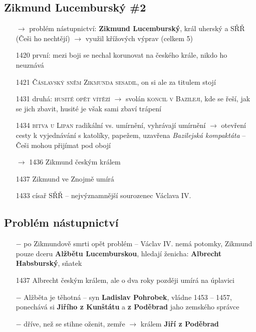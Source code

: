 \documentclass{article}
\begin{document}
\subsection*{Zikmund Lucemburský \#2}
\begin{itemize}
    \vspace{-0.5em}
    \setlength\itemsep{0.15em}
    \item[$\rightarrow$] problém nástupnictví: \textbf{Zikmund Lucemburský}, král uherský a SŘŘ (Češi ho nechtějí) $\rightarrow$ využil křížových výprav (celkem 5)
    \item[1420] první: mezi boji se nechal korunovat na českého krále, nikdo ho neuznává
    \item[1421] \textsc{Čáslavský sněm Zikmunda sesadil}, on si ale za titulem stojí
    \item[1431] druhá: \textsc{husité opět vítězí} $\rightarrow$ svolán \textsc{koncil v Bazileji}, kde se řeší, jak se jich zbavit, husité je však sami zbaví trápení
    \item[1434] \textsc{bitva u Lipan} radikální vs. umírnění, vyhrávají umírnění $\rightarrow$ otevření cesty k vyjednávání s katolíky, papežem, uzavřena \textit{Bazilejská kompaktáta} -- Češi mohou přijímat pod obojí
    \item[$\rightarrow$ 1436] Zikmund českým králem
    \item[1437] Zikmund ve Znojmě umírá
    \item[1433] císař SŘŘ -- nejvýznamnější sourozenec Václava IV.
\end{itemize}


\subsection*{Problém nástupnictví}
\begin{itemize}
    \vspace{-0.5em}
    \setlength\itemsep{0.15em}
    \item[$-$] po Zikmundově smrti opět problém -- Václav IV. nemá potomky, Zikmund pouze dceru \textbf{Alžbětu Lucemburskou}, hledají ženicha: \textbf{Albrecht Habsburský}, sňatek
    \item[1437] Albrecht českým králem, ale o dva roky později umírá na úplavici
    \item[$-$] Alžběta je těhotná -- syn \textbf{Ladislav Pohrobek}, vládne 1453 -- 1457, ponechává si \textbf{Jiřího z Kunštátu} a \textbf{z Poděbrad} jaho zemského správce
    \item[$-$] dříve, než se stihne oženit, zemře $\rightarrow$ králem \textbf{Jiří z Poděbrad}



\end{itemize}
\end{document}
